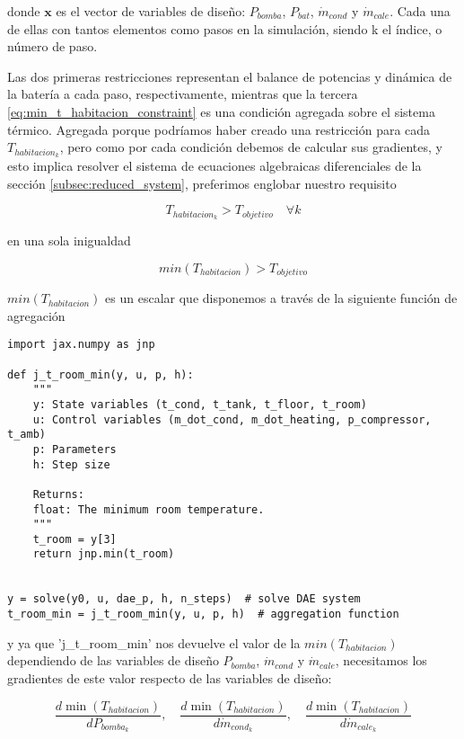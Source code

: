 donde $\mathbf{x}$ es el vector de variables de diseño: $P_{bomba}$, $P_{bat}$,
$\dot{m}_{cond}$ y $\dot{m}_{cale}$. Cada una de ellas con tantos elementos
como pasos en la simulación, siendo k el índice, o número de paso.

Las dos primeras restricciones representan el balance de potencias y dinámica
de la batería a cada paso, respectivamente, mientras que la tercera
\eqref{eq:min_t_habitacion_constraint} es una condición agregada sobre el
sistema térmico. Agregada porque podríamos haber creado una restricción para
cada $T_{habitacion_k}$, pero como por cada condición debemos de calcular sus
gradientes, y esto implica resolver el sistema de ecuaciones algebraicas
diferenciales de la sección \ref{subsec:reduced_system}, preferimos englobar
nuestro requisito

\begin{equation*}
	T_{habitacion_k} > T_{objetivo}  \quad \forall k
\end{equation*}

en una sola inigualdad

\begin{equation*}
	min(T_{habitacion}) > T_{objetivo}
\end{equation*}


$min(T_{habitacion})$ es un escalar que disponemos a través de la siguiente
función de agregación

\begin{verbatim}
import jax.numpy as jnp

def j_t_room_min(y, u, p, h):
    """
    y: State variables (t_cond, t_tank, t_floor, t_room)
    u: Control variables (m_dot_cond, m_dot_heating, p_compressor, t_amb)
    p: Parameters
    h: Step size

    Returns:
    float: The minimum room temperature.
    """
    t_room = y[3]
    return jnp.min(t_room)


y = solve(y0, u, dae_p, h, n_steps)  # solve DAE system
t_room_min = j_t_room_min(y, u, p, h)  # aggregation function
\end{verbatim}


y ya que 'j\_t\_room\_min' nos devuelve el valor de la $min(T_{habitacion})$
dependiendo de las variables de diseño $P_{bomba}$, $\dot{m}_{cond}$ y
$\dot{m}_{cale}$, necesitamos los gradientes de este valor respecto de las
variables de diseño:

\begin{equation*}
	\frac{d \min(T_{habitacion})}{d P_{bomba_k}}, \quad \frac{d \min(T_{habitacion})}{d \dot{m}_{cond_k}}, \quad \frac{d \min(T_{habitacion})}{d \dot{m}_{cale_k}}
\end{equation*}


